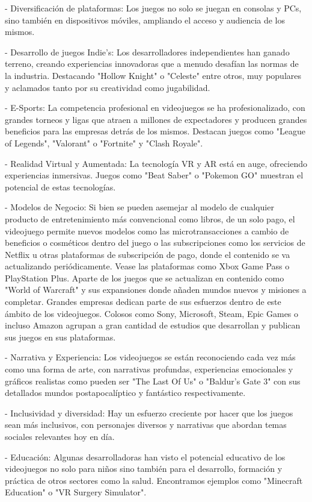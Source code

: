 - Diversificación de plataformas: Los juegos no solo se juegan en consolas y PCs, sino también en dispositivos móviles, ampliando el acceso y audiencia de los mismos.

- Desarrollo de juegos Indie's: Los desarrolladores independientes han ganado terreno, creando experiencias innovadoras que a menudo desafían las normas de la industria. Destacando "Hollow Knight" o "Celeste" entre otros, muy populares y aclamados tanto por su creatividad como jugabilidad.

- E-Sports: La competencia profesional en videojuegos se ha profesionalizado, con grandes torneos y ligas que atraen a millones de expectadores y producen grandes beneficios para las empresas detrás de los mismos. Destacan juegos como "League of Legends", "Valorant" o "Fortnite" y "Clash Royale".

- Realidad Virtual y Aumentada: La tecnología VR y AR está en auge, ofreciendo experiencias inmersivas. Juegos como "Beat Saber" o "Pokemon GO" muestran el potencial de estas tecnologías.

- Modelos de Negocio: Si bien se pueden asemejar al modelo de cualquier producto de entretenimiento más convencional como libros, de un solo pago, el videojuego permite nuevos modelos como las microtransacciones a cambio de beneficios o cosméticos dentro del juego o las subscripciones como los servicios de Netflix u otras plataformas de subscripción de pago, donde el contenido se va actualizando periódicamente. Vease las plataformas como Xbox Game Pass o PlayStation Plus. Aparte de los juegos que se actualizan en contenido como "World of Warcraft" y sus expansiones donde añaden mundos nuevos y misiones a completar. 
Grandes empresas dedican parte de sus esfuerzos dentro de este ámbito de los videojuegos. Colosos como Sony, Microsoft, Steam, Epic Games o incluso Amazon agrupan a gran cantidad de estudios que desarrollan y publican sus juegos en sus plataformas.

- Narrativa y Experiencia: Los videojuegos se están reconociendo cada vez más como una forma de arte, con narrativas profundas, experiencias emocionales y gráficos realistas como pueden ser "The Last Of Us" o "Baldur's Gate 3" con sus detallados mundos postapocalíptico y fantástico respectivamente.

- Inclusividad y diversidad: Hay un esfuerzo creciente por hacer que los juegos sean más inclusivos, con personajes diversos y narrativas que abordan temas sociales relevantes hoy en día.

- Educación: Algunas desarrolladoras han visto el potencial educativo de los videojuegos no solo para niños sino también para el desarrollo, formación y práctica de otros sectores como la salud. Encontramos ejemplos como "Minecraft Education" o "VR Surgery Simulator".

